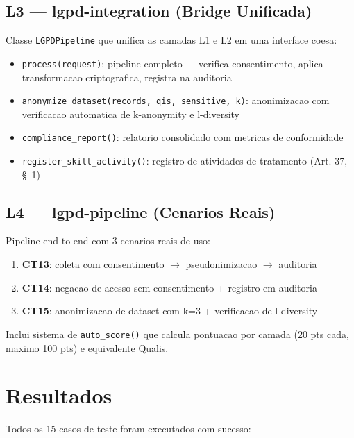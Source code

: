 \documentclass[5p]{elsarticle}
\begin{document}
\subsection{L3 --- lgpd-integration (Bridge Unificada)}
\label{sec:l3}

Classe \texttt{LGPDPipeline} que unifica as camadas L1 e L2 em uma interface coesa:

\begin{itemize}
    \item \texttt{process(request)}: pipeline completo --- verifica consentimento,
    aplica transformacao criptografica, registra na auditoria
    \item \texttt{anonymize\_dataset(records, qis, sensitive, k)}: anonimizacao com
    verificacao automatica de k-anonymity e l-diversity
    \item \texttt{compliance\_report()}: relatorio consolidado com metricas de conformidade
    \item \texttt{register\_skill\_activity()}: registro de atividades de tratamento
    (Art. 37, \S\ 1\degree)
\end{itemize}

\subsection{L4 --- lgpd-pipeline (Cenarios Reais)}
\label{sec:l4}

Pipeline end-to-end com 3 cenarios reais de uso:

\begin{enumerate}
    \item \textbf{CT13}: coleta com consentimento $\rightarrow$ pseudonimizacao $\rightarrow$ auditoria
    \item \textbf{CT14}: negacao de acesso sem consentimento + registro em auditoria
    \item \textbf{CT15}: anonimizacao de dataset com k=3 + verificacao de l-diversity
\end{enumerate}

Inclui sistema de \texttt{auto\_score()} que calcula pontuacao por camada (20 pts cada,
maximo 100 pts) e equivalente Qualis.

\section{Resultados}
\label{sec:resultados}

Todos os 15 casos de teste foram executados com sucesso:
\end{document}
